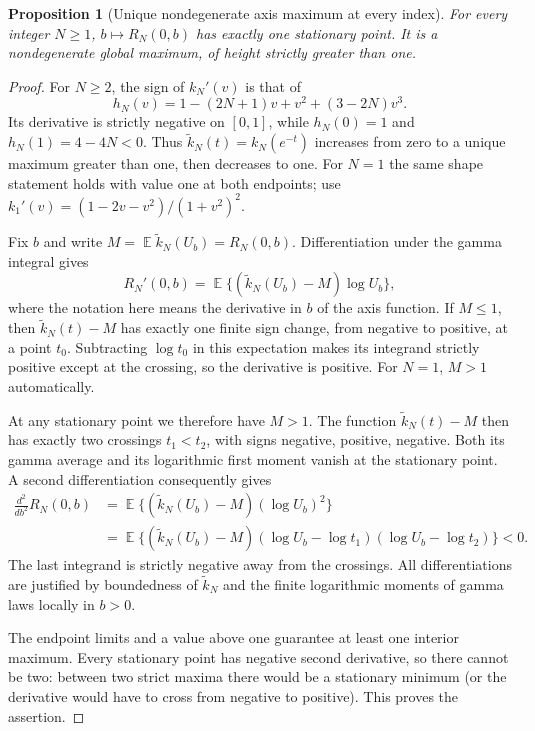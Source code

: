 \documentclass[11pt]{article}
\numberwithin{equation}{section}
\newtheorem{proposition}[theorem]{Proposition}
\theoremstyle{definition}
\theoremstyle{remark}
\DeclareMathOperator{\E}{\mathbb E}
\begin{document}
\begin{proposition}[Unique nondegenerate axis maximum at every index]
\label{eul:prop:axisunique}
For every integer $N\geq1$, $b\mapsto R_N(0,b)$ has exactly one
stationary point.  It is a nondegenerate global maximum, of height
strictly greater than one.
\end{proposition}
\begin{proof}
For $N\geq2$, the sign of $k_N'(v)$ is that of
\[
 h_N(v)=1-(2N+1)v+v^2+(3-2N)v^3.
\]
Its derivative is strictly negative on $[0,1]$, while
$h_N(0)=1$ and $h_N(1)=4-4N<0$.
Thus $\widetilde k_N(t)=k_N(e^{-t})$ increases from zero to a unique maximum
greater than one, then decreases to one.  For $N=1$ the same shape
statement holds with value one at both endpoints; use
$k_1'(v)=(1-2v-v^2)/(1+v^2)^2$.

Fix $b$ and write $M=\E \widetilde k_N(U_b)=R_N(0,b)$.
Differentiation under the gamma integral gives
\[
 R_N'(0,b)=\E\{(\widetilde k_N(U_b)-M)\log U_b\},
\]
where the notation here means the derivative in $b$ of the axis
function.  If $M\leq1$, then $\widetilde k_N(t)-M$ has exactly one finite sign
change, from negative to positive, at a point $t_0$.
Subtracting $\log t_0$ in this expectation makes its integrand
strictly positive except at the crossing, so the derivative is
positive.  For $N=1$, $M>1$ automatically.

At any stationary point we therefore have $M>1$.  The function
$\widetilde k_N(t)-M$ then has exactly two crossings $t_1<t_2$, with signs
negative, positive, negative.  Both its gamma average and its
logarithmic first moment vanish at the stationary point.  A second
differentiation consequently gives
\begin{align*}
 \frac{d^2}{db^2}R_N(0,b)
 &=\E\{(\widetilde k_N(U_b)-M)(\log U_b)^2\}\\
 &=\E\{(\widetilde k_N(U_b)-M)(\log U_b-\log t_1)
                          (\log U_b-\log t_2)\}<0.
\end{align*}
The last integrand is strictly negative away from the crossings.
All differentiations are justified by boundedness of $\widetilde k_N$ and the
finite logarithmic moments of gamma laws locally in $b>0$.

The endpoint limits and a value above one guarantee at least one
interior maximum.  Every stationary point has negative second
derivative, so there cannot be two: between two strict maxima there
would be a stationary minimum (or the derivative would have to
cross from negative to positive).  This proves the assertion.
\end{proof}
\end{document}
